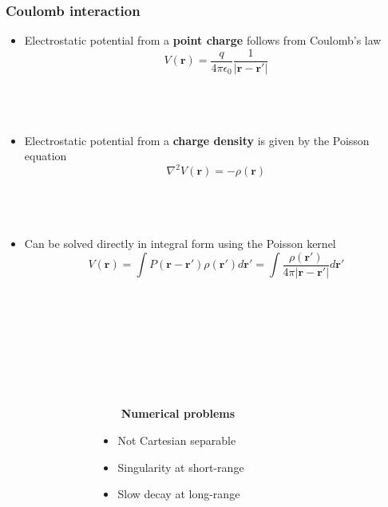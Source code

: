 \begin{frame}
    \frametitle{Coulomb interaction}
    \begin{itemize}
	\item	Electrostatic potential from a \textbf{point charge} follows from Coulomb's law
		\begin{equation}
		    \nonumber
		    V(\boldsymbol{r}) = \frac{q}{4\pi\epsilon_0}
		    \frac{1}{|\boldsymbol{r}-\boldsymbol{r}'|}
		\end{equation}
		\ \\
		\ \\
		\ \\
	\item	Electrostatic potential from a \textbf{charge density} is given by the Poisson equation
		\begin{equation}
		    \nonumber
		    \nabla^2 V(\boldsymbol{r}) = -\rho(\boldsymbol{r})
		\end{equation}
		\ \\
		\ \\
		\ \\
	\item	Can be solved directly in integral form using the Poisson kernel
		\begin{equation}
		    \nonumber
		    V(\boldsymbol{r}) = 
		    \int P(\boldsymbol{r}-\boldsymbol{r'})\rho(\boldsymbol{r'}) d\boldsymbol{r'} =
		    \int\frac{\rho(\boldsymbol{r'})}{4\pi|\boldsymbol{r} - \boldsymbol{r'}|} d\boldsymbol{r'} 
		\end{equation}
		\ \\
		\ \\
		\ \\
    \end{itemize}
    \ \\
    \ \\
    \ \\
    \begin{columns}
    \begin{column}{.30\textwidth}
        \ \\
    \end{column}
    \begin{column}{.40\textwidth}
        \ \ \ \ \textbf{Numerical problems}
        \begin{itemize}
	    \item Not Cartesian separable
	    \item Singularity at short-range
	    \item Slow decay at long-range
	\end{itemize}
    \end{column}
    \begin{column}{.30\textwidth}
	\ \\
    \end{column}
    \end{columns}
\end{frame}

